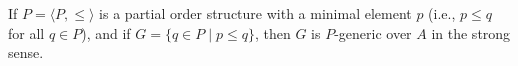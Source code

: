 If $P = \langle P, \leq \rangle$ is a partial order structure with a minimal element $p$ (i.e., $p \leq q$ for all $q \in P$), and if $G = \{q \in P \mid p \leq q\}$, then $G$ is $P$-generic over $A$ in the strong sense.
